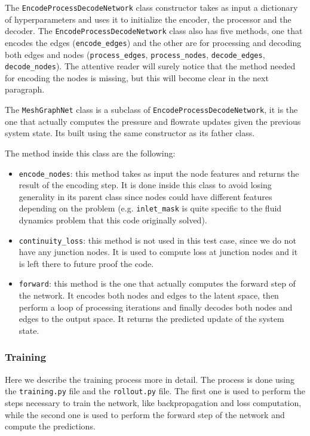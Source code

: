 \documentclass[11pt,a4paper]{article}
\begin{document}
The \texttt{EncodeProcessDecodeNetwork} class constructor takes as input a dictionary of hyperparameters and uses it to initialize the encoder, the processor and the decoder. 
The \texttt{EncodeProcessDecodeNetwork} class also has five methods, one that encodes the edges (\texttt{encode\_edges}) and the other are for processing and decoding both edges and nodes (\texttt{process\_edges}, \texttt{process\_nodes}, \texttt{decode\_edges}, \texttt{decode\_nodes}). The attentive reader will surely notice that the method needed for encoding the nodes is missing, but this will become clear in the next paragraph.


The \texttt{MeshGraphNet} class is a subclass of \texttt{EncodeProcessDecodeNetwork}, it is the one that actually computes the pressure and flowrate updates given the previous system state. Its built using the same constructor as its father class. 

The method inside this class are the following:
\begin{itemize}
    \item \texttt{encode\_nodes}: this method takes as input the node features and returns the result of the encoding step. It is done inside this class to avoid losing generality in its parent class since nodes could have different features depending on the problem (e.g. \texttt{inlet\_mask} is quite specific to the fluid dynamics problem that this code originally solved).
    \item \texttt{continuity\_loss}: this method is not used in this test case, since we do not have any junction nodes. It is used to compute loss at junction nodes and it is left there to future proof the code.
    \item \texttt{forward}: this method is the one that actually computes the forward step of the network. It encodes both nodes and edges to the latent space, then perform a loop of processing iterations and finally decodes both nodes and edges to the output space. It returns the predicted update of the system state.
\end{itemize}

\subsubsection*{Training}

Here we describe the training process more in detail. The process is done using the \texttt{training.py} file and the \texttt{rollout.py} file. The first one is used to perform the steps necessary to train the network, like backpropagation and loss computation, while the second one is used to perform the forward step of the network and compute the predictions.
\end{document}
